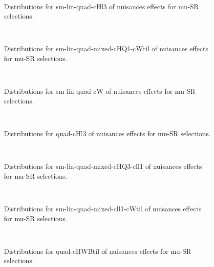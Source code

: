 \begin{figure}[htbp]  
\centering 
\\ 
\caption{ 
   Distributions for sm-lin-quad-cHl3 of nuisances effects for mu-SR selections.
} 
\label{fig:sm_lin_quad_cHl3_mu_SR} 
\end{figure} 




\begin{figure}[htbp]  
\centering 
\\ 
\caption{ 
   Distributions for sm-lin-quad-mixed-cHQ1-cWtil of nuisances effects for mu-SR selections.
} 
\label{fig:sm_lin_quad_mixed_cHQ1_cWtil_mu_SR} 
\end{figure} 




\begin{figure}[htbp]  
\centering 
\\ 
\caption{ 
   Distributions for sm-lin-quad-cW of nuisances effects for mu-SR selections.
} 
\label{fig:sm_lin_quad_cW_mu_SR} 
\end{figure} 




\begin{figure}[htbp]  
\centering 
\\ 
\caption{ 
   Distributions for quad-cHl3 of nuisances effects for mu-SR selections.
} 
\label{fig:quad_cHl3_mu_SR} 
\end{figure} 




\begin{figure}[htbp]  
\centering 
\\ 
\caption{ 
   Distributions for sm-lin-quad-mixed-cHQ3-cll1 of nuisances effects for mu-SR selections.
} 
\label{fig:sm_lin_quad_mixed_cHQ3_cll1_mu_SR} 
\end{figure} 




\begin{figure}[htbp]  
\centering 
\\ 
\caption{ 
   Distributions for sm-lin-quad-mixed-cll1-cWtil of nuisances effects for mu-SR selections.
} 
\label{fig:sm_lin_quad_mixed_cll1_cWtil_mu_SR} 
\end{figure} 




\begin{figure}[htbp]  
\centering 
\\ 
\caption{ 
   Distributions for quad-cHWBtil of nuisances effects for mu-SR selections.
} 
\label{fig:quad_cHWBtil_mu_SR} 
\end{figure} 




